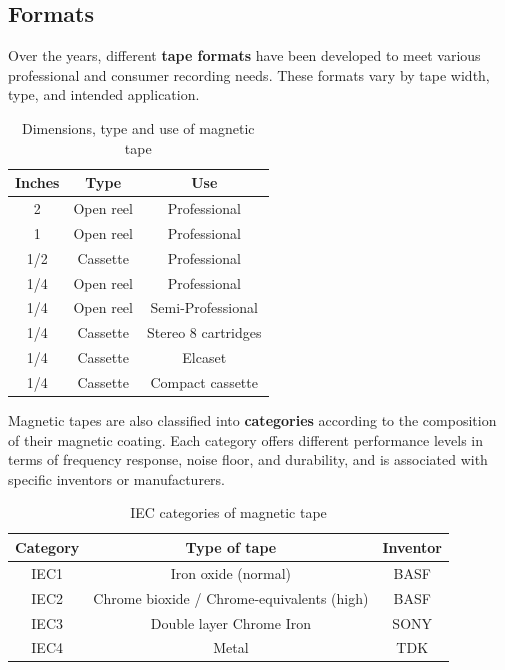 
\subsection{Formats}
Over the years, different \textbf{tape formats} have been developed to meet various professional and consumer recording needs. 
These formats vary by tape width, type, and intended application.

\begin{table}[H]
\centering
\begin{tabular}{ccc}
\toprule
\textbf{Inches} & \textbf{Type} & \textbf{Use} \\
\midrule
2 & Open reel & Professional \\
1 & Open reel & Professional \\
1/2 & Cassette & Professional \\
1/4 & Open reel & Professional \\
1/4 & Open reel & Semi-Professional \\
1/4 & Cassette & Stereo 8 cartridges \\
1/4 & Cassette & Elcaset \\
1/4 & Cassette & Compact cassette \\
\bottomrule
\end{tabular}
\caption{Dimensions, type and use of magnetic tape}
\end{table}

Magnetic tapes are also classified into \textbf{categories} according to the composition of their magnetic coating. 
Each category offers different performance levels in terms of frequency response, noise floor, and durability, and is associated with specific inventors or manufacturers.

\begin{table}[H]
\centering
\begin{tabular}{ccc}
\toprule
\textbf{Category} & \textbf{Type of tape} & \textbf{Inventor} \\
\midrule
IEC1 & Iron oxide (normal) & BASF \\
IEC2 & Chrome bioxide / Chrome-equivalents (high) & BASF \\
IEC3 & Double layer Chrome Iron & SONY \\
IEC4 & Metal & TDK \\
\bottomrule
\end{tabular}
\caption{IEC categories of magnetic tape}
\end{table}

